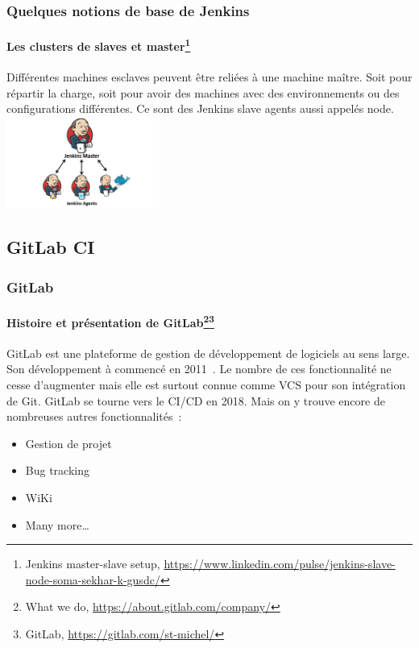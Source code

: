 \documentclass{beamer}
\begin{document}
    \begin{frame}
        \frametitle{Quelques notions de base de Jenkins}
        \framesubtitle{Les clusters de slaves et master\footnote{Jenkins master-slave setup, \url{https://www.linkedin.com/pulse/jenkins-slave-node-soma-sekhar-k-gusdc/}}}
        \transdissolve
        Différentes machines esclaves peuvent être reliées à une machine maître.
        Soit pour répartir la charge, soit pour avoir des machines avec des environnements ou des configurations différentes.
        Ce sont des Jenkins slave agents aussi appelés node.
        \bigbreak
        \centering
        \includegraphics[width=5cm]{image/jenkins-cluster.png}
    \end{frame}

    \subsection{GitLab CI}\label{subsec:gitlab-ci}

    \begin{frame}
        \frametitle{GitLab}
        \framesubtitle{Histoire et présentation de GitLab\footnote{What we do, \url{https://about.gitlab.com/company/}}\footnotestep\footnote{GitLab, \url{https://gitlab.com/st-michel/}}}
        \transdissolve
        GitLab est une plateforme de gestion de développement de logiciels au sens large.
        Son développement à commencé en 2011~.
        \bigbreak
        Le nombre de ces fonctionnalité ne cesse d'augmenter mais elle est surtout connue comme VCS pour son intégration de Git.
        \bigbreak
        GitLab se tourne vers le CI/CD en 2018.
        \bigbreak
        Mais on y trouve encore de nombreuses autres fonctionnalités~:
        \begin{itemize}
            \item Gestion de projet
            \item Bug tracking
            \item WiKi
            \item Many more\ldots
        \end{itemize}
    \end{frame}
\end{document}
